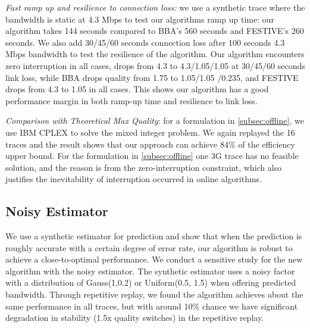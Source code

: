 \emph{Fast ramp up and resilience to connection loss:} we use a synthetic trace where the bandwidth is static at 4.3 Mbps to test our algorithms ramp up time: our algorithm takes 144 seconds compared to BBA's 560 seconds and FESTIVE's 260 seconds. We also add 30/45/60 seconds connection loss after 100 seconds 4.3 Mbps bandwidth to test the resilience of the algorithm. Our algorithm encounters zero interruption in all cases, drops from 4.3 to 4.3/1.05/1.05 at 30/45/60 seconds link loss, while BBA drops quality from 1.75 to 1.05/1.05 /0.235, and FESTIVE drops from 4.3 to 1.05 in all cases. This shows our algorithm has a good performance margin in both ramp-up time and resilience to link loss. 

\emph{Comparison with Theoretical Max Quality}: for a formulation in \autoref{subsec:offline}, we use IBM CPLEX to solve the mixed integer problem. We again replayed the 16 traces and the result shows that our approach can achieve 84\% of the efficiency upper bound. For the formulation in \autoref{subsec:offline} one 3G trace has no feasible solution, and the reason is from the zero-interruption constraint, which also justifies the inevitability of interruption occurred in online algorithms. 

\subsection{Noisy Estimator}\label{sub:noisy}
We use a synthetic estimator for prediction and show that when the prediction is roughly accurate with a certain degree of error rate, our algorithm is robust to achieve a close-to-optimal performance. We conduct a sensitive study for the new algorithm with the noisy estimator. The synthetic estimator uses a noisy factor with a distribution of Gauss(1,0.2) or Uniform(0.5, 1.5) when offering predicted bandwidth. Through repetitive replay, we found the algorithm achieves about the same performance in all traces, but with around 10\% chance we have significant degradation in stability (1.5x quality switches) in the repetitive replay. 

